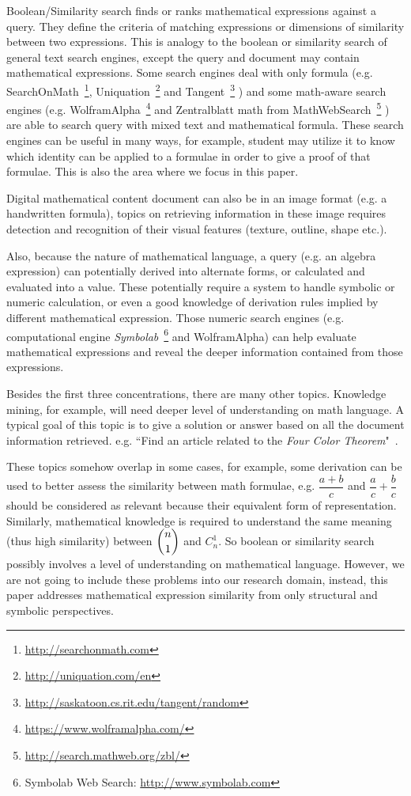 Boolean/Similarity search finds or ranks mathematical expressions against a query. 
They define the criteria of matching expressions or dimensions of similarity between two expressions.
This is analogy to the boolean or similarity search of general text search engines,
except the query and document may contain mathematical expressions. 
Some search engines deal with only formula (e.g. 
SearchOnMath~\footnote{\url{http://searchonmath.com}},
Uniquation~\footnote{\url{http://uniquation.com/en}}
and 
Tangent~\footnote{\url{http://saskatoon.cs.rit.edu/tangent/random}}
) 
and some math-aware search engines (e.g.
WolframAlpha~\footnote{\url{https://www.wolframalpha.com/}} and 
Zentralblatt math from MathWebSearch~\footnote{\url{http://search.mathweb.org/zbl/}}
)
are able to search query with mixed text and mathematical formula.
These search engines can be useful in many ways, for example, student may utilize it to know which identity can be applied to a formulae in order to give a proof of that formulae.
This is also the area where we focus in this paper. 

Digital mathematical content document can also be in an image format (e.g. a handwritten formula), topics on retrieving information in these image requires detection and recognition of their visual features (texture, outline, shape etc.).

Also, because the nature of mathematical language, a query (e.g. an algebra expression) can potentially derived into alternate forms, or calculated and evaluated into a value. 
These potentially require a system to handle symbolic or numeric calculation, or even a good knowledge of derivation rules implied by different mathematical expression. 
Those numeric search engines
(e.g. computational engine \textit{Symbolab}~\footnote{Symbolab Web Search: \url{http://www.symbolab.com}} and WolframAlpha)
can help evaluate mathematical expressions and reveal the deeper information contained from those expressions.

Besides the first three concentrations, there are many other topics. Knowledge mining, for example, will need deeper level of understanding on math language. A typical goal of this topic is to give a solution or answer based on all the document information retrieved. e.g. ``Find an article related to the \textit{Four Color Theorem}"~\cite{ntcirtopic}.

These topics somehow overlap in some cases, for example, some derivation can be used to better assess the similarity between math formulae, e.g. $\dfrac{a + b}{c}$ and $\dfrac{a}{c} + \dfrac{b}{c}$ should be considered as relevant because their equivalent form of representation.
Similarly, mathematical knowledge is required to understand the same meaning (thus high similarity) between $ \dbinom n 1 $ and $C_n^1$.
So boolean or similarity search possibly involves a level of understanding on mathematical language. 
However, we are not going to include these problems into our research domain, instead, this paper addresses mathematical expression similarity from only structural and symbolic perspectives.

